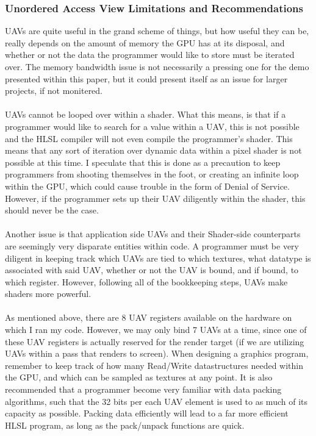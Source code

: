 \documentclass[a4paper, 12pt]{article}
\begin{document}
\subsubsection{Unordered Access View Limitations and Recommendations}

UAVs are quite useful in the grand scheme of things, but how useful they can
be, really depends on the amount of memory the GPU has at its disposal, and
whether or not the data the programmer would like to store must be iterated
over. The memory bandwidth issue is not necessarily a pressing one for the
demo presented within this paper, but it could present itself as an issue for
larger projects, if not monitered. \\ \\ UAVs cannot be looped over within a
shader. What this means, is that if a programmer would like to search for a
value within a UAV, this is not possible and the HLSL compiler will not even
compile the programmer's shader. This means that any sort of iteration over
dynamic data within a pixel shader is not possible at this time. I speculate
that this is done as a precaution to keep programmers from shooting themselves
in the foot, or creating an infinite loop within the GPU, which could cause
trouble in the form of Denial of Service. However, if the programmer sets up
their UAV diligently within the shader, this should never be the case. \\ \\
Another issue is that application side UAVs and their Shader-side counterparts
are seemingly very disparate entities within code. A programmer must be very
diligent in keeping track which UAVs are tied to which textures, what datatype
is associated with said UAV, whether or not the UAV is bound, and if bound, to
which register. However, following all of the bookkeeping steps, UAVs make
shaders more powerful. \\ \\ As mentioned above, there are 8 UAV registers
available on the hardware on which I ran my code. However, we may only bind 7
UAVs at a time, since one of these UAV registers is actually reserved for the
render target (if we are utilizing UAVs within a pass that renders to screen).
When designing a graphics program, remember to keep track of how many
Read/Write datastructures needed within the GPU, and which can be sampled as
textures at any point. It is also recommended that a programmer become very
familiar with data packing algorithms, such that the 32 bits per each UAV
element is used to as much of its capacity as possible. Packing data
efficiently will lead to a far more efficient HLSL program, as long as the
pack/unpack functions are quick.
\end{document}
